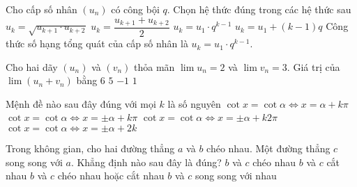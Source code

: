 \begin{ex}%
	Cho cấp số nhân $(u_n)$ có công bội $q$. Chọn hệ thức đúng trong các hệ thức sau
	\choice
	{$u_k=\sqrt{u_{k+1}\cdot u_{k+2}}$}
	{$u_k=\dfrac{u_{k+1}+u_{k+2}}{2}$}
	{\True $u_k=u_1\cdot q^{k-1}$}
	{$u_k=u_1+(k-1)q$}
	\loigiai
	{
		Công thức số hạng tổng quát của cấp số nhân là $u_k=u_1\cdot q^{k-1}$.
	}
\end{ex}

\begin{ex}%
	Cho hai dãy $\left(u_n\right)$ và $\left(v_n\right)$ thỏa mãn $\lim u_n=2$ và $\lim v_n=3.$ Giá trị của $\lim\left(u_n+v_n\right)$ bằng
	\choice
	{$ 6$}
	{\True $ 5$}
	{$-1$}
	{$ 1$}

\end{ex}

\begin{ex}%
	Mệnh đề nào sau đây đúng với mọi $k$ là số nguyên
	\choice
	{\True $\cot{x} = \cot{\alpha} \Leftrightarrow x = \alpha + k \pi$}
	{$\cot{x} = \cot{\alpha} \Leftrightarrow x = \pm \alpha + k \pi$}
	{$\cot{x} = \cot{\alpha} \Leftrightarrow x = \pm \alpha + k2 \pi$}
	{$\cot{x} = \cot{\alpha} \Leftrightarrow x = \pm \alpha + 2k$}
\end{ex}

\begin{ex}%
	Trong không gian, cho hai đường thẳng $a$ và $b$ chéo nhau. Một đường thẳng $c$ song song với $a$. Khẳng định nào sau đây là đúng?
	\choice
	{$b$ và $c$ chéo nhau}
	{$b$ và $c$ cắt nhau}
	{\True $b$ và $c$ chéo nhau hoặc cắt nhau}
	{$b$ và $c$ song song với nhau}
\end{ex}

